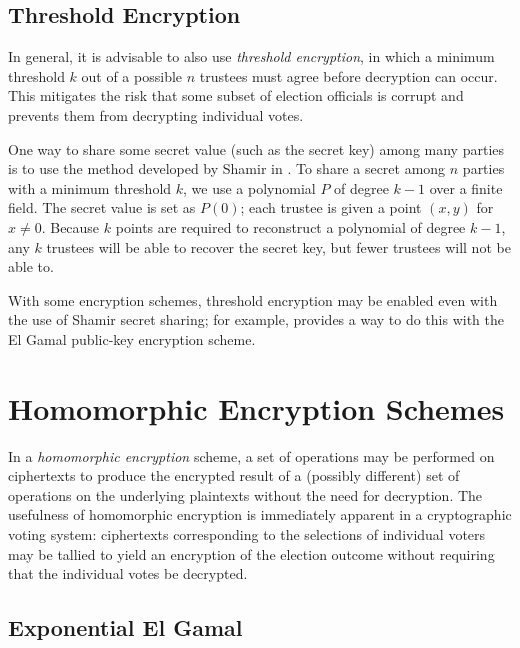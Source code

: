 \subsection{Threshold Encryption} \label{evote:design:threshold}
In general, it is advisable to also use \emph{threshold encryption}, in which a minimum threshold $k$ out of a possible $n$ trustees must agree before decryption can occur. This mitigates the risk that some subset of election officials is corrupt and prevents them from decrypting individual votes.

One way to share some secret value (such as the secret key) among many parties is to use the method developed by Shamir in \cite{shamir79}. To share a secret among $n$ parties with a minimum threshold $k$, we use a polynomial $P$ of degree $k-1$ over a finite field. The secret value is set as $P(0)$; each trustee is given a point $(x, y)$ for $x \neq 0$. Because $k$ points are required to reconstruct a polynomial of degree $k-1$, any $k$ trustees will be able to recover the secret key, but fewer trustees will not be able to.

With some encryption schemes, threshold encryption may be enabled even with the use of Shamir secret sharing; for example, \cite{pedersen91, gennaro} provides a way to do this with the El Gamal public-key encryption scheme.

\section{Homomorphic Encryption Schemes} \label{evote:homomorphic}

In a \emph{homomorphic encryption} scheme, a set of operations may be performed on ciphertexts to produce the encrypted result of a (possibly different) set of operations on the underlying plaintexts without the need for decryption. The usefulness of homomorphic encryption is immediately apparent in a cryptographic voting system: ciphertexts corresponding to the selections of individual voters may be tallied to yield an encryption of the election outcome without requiring that the individual votes be decrypted.

\subsection{Exponential El Gamal} \label{evote:homomorphic:elgamal}

